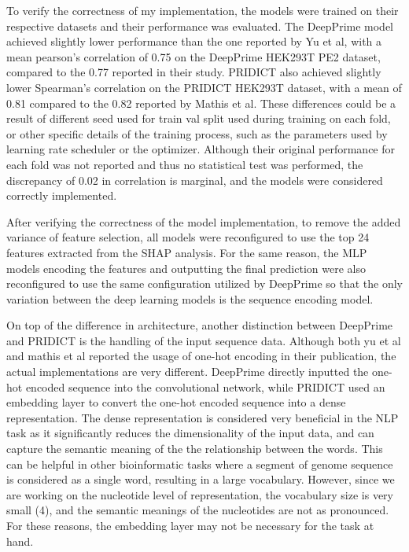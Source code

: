 To verify the correctness of my implementation, the models were trained on their respective datasets and their performance was evaluated. The DeepPrime model achieved slightly lower performance than the one reported by Yu et al, with a mean pearson's correlation of 0.75 on the DeepPrime HEK293T PE2 dataset, compared to the 0.77 reported in their study. PRIDICT also achieved slightly lower Spearman's correlation on the PRIDICT HEK293T dataset, with a mean of 0.81 compared to the 0.82 reported by Mathis et al. These differences could be a result of different seed used for train val split used during training on each fold, or other specific details of the training process, such as the parameters used by learning rate scheduler or the optimizer. Although their original performance for each fold was not reported and thus no statistical test was performed, the discrepancy of 0.02 in correlation is marginal, and the models were considered correctly implemented.

After verifying the correctness of the model implementation, to remove the added variance of feature selection, all models were reconfigured to use the top 24 features extracted from the SHAP analysis. For the same reason, the MLP models encoding the features and outputting the final prediction were also reconfigured to use the same configuration utilized by DeepPrime so that the only variation between the deep learning models is the sequence encoding model. 

On top of the difference in architecture, another distinction between DeepPrime and PRIDICT is the handling of the input sequence data. Although both yu et al and mathis et al reported the usage of one-hot encoding in their publication, the actual implementations are very different. DeepPrime directly inputted the one-hot encoded sequence into the convolutional network, while PRIDICT used an embedding layer to convert the one-hot encoded sequence into a dense representation. The dense representation is considered very beneficial in the NLP task as it significantly reduces the dimensionality of the input data, and can capture the semantic meaning of the the relationship between the words\cite{goldbergPrimerNeuralNetwork2015}. This can be helpful in other bioinformatic tasks where a segment of genome sequence is considered as a single word, resulting in a large vocabulary\cite{cegliaIdentificationTranscriptionalPrograms2023}. However, since we are working on the nucleotide level of representation, the vocabulary size is very small (4), and the semantic meanings of the nucleotides are not as pronounced. For these reasons, the embedding layer may not be necessary for the task at hand.

